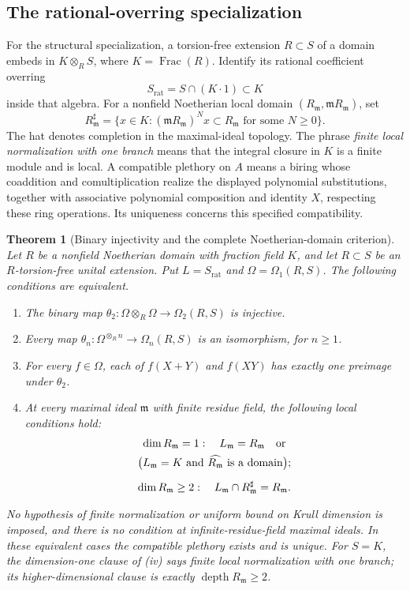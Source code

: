 \documentclass[11pt,a4paper]{article}
\newtheorem{theorem}{Theorem}[section]
\theoremstyle{definition}
\begin{document}
\subsection{The rational-overring specialization}
For the structural specialization, a torsion-free extension
$R\subset S$ of a domain embeds in $K\otimes_R S$, where
$K=\operatorname{Frac}(R)$. Identify its rational coefficient overring
\[
 S_{\mathrm{rat}}=S\cap(K\cdot1)\subset K
\]
inside that algebra. For a nonfield Noetherian local domain
$(R_{\mathfrak m},\mathfrak mR_{\mathfrak m})$, set
\[
 R_{\mathfrak m}^{\sharp}
 =\{x\in K:(\mathfrak mR_{\mathfrak m})^N x
                       \subset R_{\mathfrak m}\text{ for some }N\ge0\}.
\]
The hat denotes completion in the maximal-ideal topology. The phrase
\emph{finite local normalization with one branch} means that the
integral closure in $K$ is a finite module and is local. A compatible
plethory on $A$ means a biring whose coaddition and comultiplication
realize the displayed polynomial substitutions, together with
associative polynomial composition and identity $X$, respecting these
ring operations. Its uniqueness concerns this specified compatibility.
\begin{theorem}[Binary injectivity and the complete Noetherian-domain criterion]\label{result-39}
Let $R$ be a nonfield Noetherian domain with
fraction field $K$, and let $R\subset S$ be an
$R$-torsion-free unital extension. Put
$L=S_{\mathrm{rat}}$ and $\Omega=\Omega_1(R,S)$.
The following conditions are equivalent.
\begin{enumerate}[label=(\roman*)]
\item The binary map
$\theta_2:\Omega\otimes_R\Omega\to\Omega_2(R,S)$ is injective.
\item Every map $\theta_n:\Omega^{\otimes_R n}\to\Omega_n(R,S)$
is an isomorphism, for $n\ge1$.
\item For every $f\in\Omega$, each of $f(X+Y)$ and $f(XY)$
has exactly one preimage under $\theta_2$.
\item At every maximal ideal $\mathfrak m$ with finite residue field,
the following local conditions hold:
\begin{equation}
\begin{gathered}
 \dim R_{\mathfrak m}=1:\quad
 L_{\mathfrak m}=R_{\mathfrak m}\quad\hbox{or}\\
 \bigl(L_{\mathfrak m}=K\text{ and }
        \widehat{R_{\mathfrak m}}\text{ is a domain}\bigr);\\[2mm]
 \dim R_{\mathfrak m}\ge2:\quad
 L_{\mathfrak m}\cap R_{\mathfrak m}^{\sharp}=R_{\mathfrak m}.
\end{gathered}                                                   \label{equation-79}
\end{equation}
\end{enumerate}
No hypothesis of finite normalization or uniform bound on
Krull dimension is imposed, and there is no condition at
infinite-residue-field maximal ideals. In these equivalent
cases the compatible plethory exists and is unique.
For $S=K$, the dimension-one clause of (iv) says finite local
normalization with one branch; its higher-dimensional clause
is exactly $\operatorname{depth}R_{\mathfrak m}\ge2$.
\end{theorem}
\end{document}
